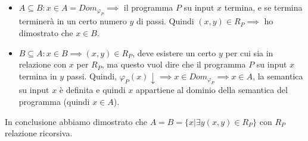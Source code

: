 \documentclass{article}
\begin{document}
\begin{itemize}
    \item $A\subseteq B: x\in A=Dom_{\varphi_P}\implies$ il programma $P$
    su input $x$ termina, e se termina terminerà in un certo numero $y$ di passi.
    Quindi $(x,y)\in R_P \implies$ ho dimostrato che $x\in B$.

    \item $B\subseteq A: x\in B\implies (x,y)\in R_P$, deve esistere un certo $y$ per cui
    sia in relazione con $x$ per $R_P$, ma questo vuol dire che il programma $P$
    su input $x$ termina in $y$ passi. Quindi, $\varphi_P(x)\downarrow\implies x\in Dom_{\varphi_P}\implies x\in A$,
    la semantica su input $x$ è definita e quindi $x$ appartiene al dominio della semantica del programma (quindi
    $x\in A$).
\end{itemize}
In conclusione abbiamo dimostrato che $A=B=\{x|\exists y(x,y)\in R_P\}$ con $R_P$ relazione ricorsiva.
\end{document}
